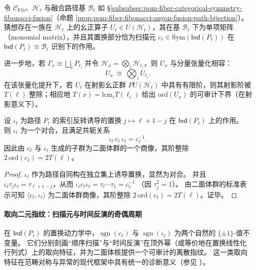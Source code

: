 

\begin{conjecture}\label{conj:pom-toggle-fusion-uplift-unitary-defect}
令 \(\mathcal C_{\mathrm{Fib}}\)、\(\mathcal H_\ell\) 与融合路径基 \(\mathcal B_\ell\) 如 \S\ref{subsubsec:pom-fiber-categorical-symmetry-fibonacci-fusion}（命题 \ref{prop:pom-fiber-fibonacci-anyon-fusion-path-bijection}）。
猜想存在一族在 \(\mathcal H_\ell\) 上的幺正算子 \(U_\ell\in U(\mathcal H_\ell)\)，其在基 \(\mathcal B_\ell\) 下为单项矩阵（monomial matrix），并且其置换部分恰为扫描元 \(c_\ell\in\mathrm{Sym}(\mathsf{Ind}(P_\ell))\) 在 \(\mathsf{Ind}(P_\ell)\cong \mathcal B_\ell\) 识别下的作用。
\par
进一步地，若 \(\Gamma_x\cong\bigsqcup_i P_{\ell_i}\) 并令 \(\mathcal H_x=\bigotimes_i\mathcal H_{\ell_i}\)，则 \(U_x\) 与分量张量化相容：
\[
U_x\ \cong\ \bigotimes_i U_{\ell_i}.
\]
在该张量化提升下，若 \(U_\ell\) 在射影幺正群 \(PU(\mathcal H_\ell)\) 中具有有限阶，则其射影阶被 \(T(\ell)\) 整除；相应地 \(T(x)=\mathrm{lcm}_iT(\ell_i)\) 给出 \(\mathrm{ord}(U_x)\) 的可审计下界（在射影意义下）。
\end{conjecture}

\begin{corollary}[时间反演的二面体核]\label{cor:pom-toggle-dihedral-time-reversal}
设 \(\iota_{\ell}\) 为路径 \(P_{\ell}\) 的索引反转诱导的置换 \(j\mapsto \ell+1-j\) 在 \(\mathsf{Ind}(P_\ell)\) 上的作用。
则 \(\iota_{\ell}\) 为一个对合，且满足共轭关系
\[
\iota_{\ell}\,c_{\ell}\,\iota_{\ell}=c_{\ell}^{-1}.
\]
因此由 \(c_\ell\) 与 \(\iota_\ell\) 生成的子群为二面体群的一个商像，其阶整除 \(2\,\mathrm{ord}(c_\ell)=2T(\ell)\)。
\end{corollary}
\begin{proof}
\(\iota_\ell\) 作为路径自同构在独立集上诱导置换，显然为对合。
并且 \(\iota_\ell\tau_j\iota_\ell=\tau_{\ell+1-j}\)，从而
\(
\iota_\ell c_\ell \iota_\ell
=\tau_\ell\cdots\tau_1
=c_\ell^{-1}
\)
（因 \(\tau_j^2=1\)）。
由二面体群的标准表示可知 \(\langle c_\ell,\iota_\ell\rangle\) 为二面体群商像，其阶整除 \(2\,\mathrm{ord}(c_\ell)=2T(\ell)\)。证毕。
\end{proof}

\paragraph{取向二元指纹：扫描元与时间反演的奇偶周期}
在 \(\mathsf{Ind}(P_\ell)\) 的置换动力学中，\(\operatorname{sgn}(c_\ell)\) 与 \(\operatorname{sgn}(\iota_\ell)\) 为两个自然的 \(\{\pm 1\}\)-值不变量。
它们分别刻画“顺序扫描”与“时间反演”在顶外幂（或等价地在置换线性化行列式）上的取向特征，并为二面体核提供一个可审计的离散指纹。
这一类取向特征在范畴对称与异常的现代框架中具有统一的诊断意义（参见 \cite{Costa2024SimonsLecturesCategoricalSymmetries}）。

